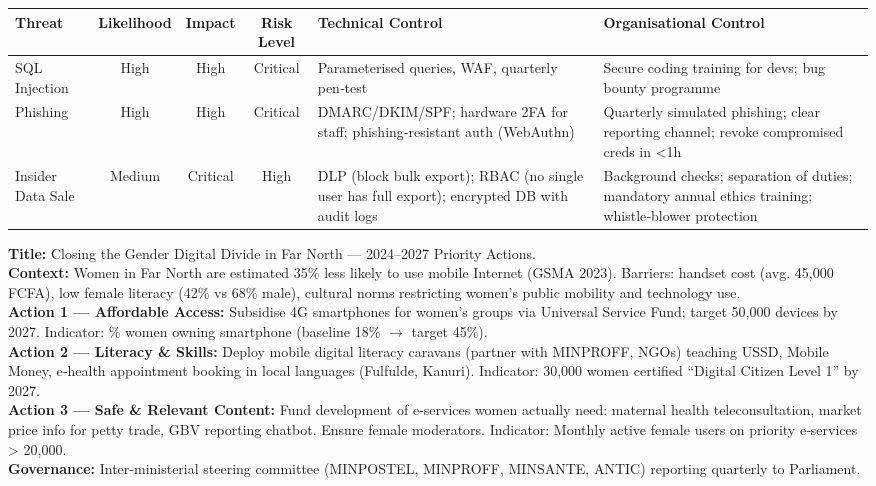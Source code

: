 \documentclass[11pt]{article}
\begin{document}
\begin{corrige}[Exercise 2]
\begin{center}
\begin{tabularx}{\linewidth}{|l|c|c|c|X|X|}\hline
\rowcolor{popblueL}
Threat & Likelihood & Impact & Risk Level & Technical Control & Organisational Control \\ \hline
SQL Injection & High & High & Critical & Parameterised queries, WAF, quarterly pen‑test & Secure coding training for devs; bug bounty programme \\ \hline
Phishing & High & High & Critical & DMARC/DKIM/SPF; hardware 2FA for staff; phishing‑resistant auth (WebAuthn) & Quarterly simulated phishing; clear reporting channel; revoke compromised creds in <1h \\ \hline
Insider Data Sale & Medium & Critical & High & DLP (block bulk export); RBAC (no single user has full export); encrypted DB with audit logs & Background checks; separation of duties; mandatory annual ethics training; whistle‑blower protection \\ \hline
\end{tabularx}
\end{center}
\end{corrige}

\begin{corrige}
\textbf{Title:} Closing the Gender Digital Divide in Far North — 2024–2027 Priority Actions. \\
\textbf{Context:} Women in Far North are estimated 35\% less likely to use mobile Internet (GSMA 2023). Barriers: handset cost (avg. 45,000 FCFA), low female literacy (42\% vs 68\% male), cultural norms restricting women’s public mobility and technology use. \\
\textbf{Action 1 — Affordable Access:} Subsidise 4G smartphones for women’s groups via Universal Service Fund; target 50,000 devices by 2027. Indicator: \% women owning smartphone (baseline 18\% $\rightarrow$ target 45\%). \\
\textbf{Action 2 — Literacy \& Skills:} Deploy mobile digital literacy caravans (partner with MINPROFF, NGOs) teaching USSD, Mobile Money, e‑health appointment booking in local languages (Fulfulde, Kanuri). Indicator: 30,000 women certified “Digital Citizen Level 1” by 2027. \\
\textbf{Action 3 — Safe \& Relevant Content:} Fund development of e‑services women actually need: maternal health teleconsultation, market price info for petty trade, GBV reporting chatbot. Ensure female moderators. Indicator: Monthly active female users on priority e‑services > 20,000. \\
\textbf{Governance:} Inter‑ministerial steering committee (MINPOSTEL, MINPROFF, MINSANTE, ANTIC) reporting quarterly to Parliament.
\end{corrige}
\end{document}
